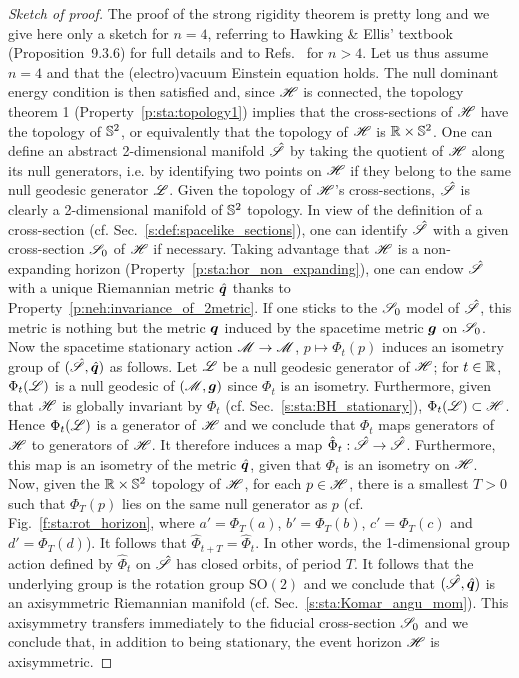 \begin{proof}[Sketch of proof]
The proof of the strong rigidity theorem is pretty long and we
give here only a sketch for $n=4$, referring to Hawking \& Ellis' textbook~\cite{HawkiE73} (Proposition~9.3.6)
for full details and to Refs.~\cite{HollaIW07,HollaI12,MoncrI08}
for $n>4$.
Let us thus assume $n=4$ and that the (electro)vacuum Einstein equation holds.
The null dominant energy condition is then satisfied and, since
$\mathscr{H}$ is connected, the topology theorem 1 (Property~\ref{p:sta:topology1})
implies that the cross-sections of $\mathscr{H}$ have the topology of $\mathbb{S}^2$,
or equivalently that the topology of $\mathscr{H}$ is $\mathbb{R}\times\mathbb{S}^2$. One can define an abstract 2-dimensional manifold $\hat{\mathscr{S}}$
by taking the quotient of $\mathscr{H}$ along its null generators, i.e. by identifying
two points on $\mathscr{H}$ if they belong to the same null geodesic generator $\mathscr{L}$. Given the
topology of $\mathscr{H}$'s cross-sections, $\hat{\mathscr{S}}$ is clearly a 2-dimensional
manifold of $\mathbb{S}^2$ topology. In view of the definition
of a cross-section (cf. Sec.~\ref{s:def:spacelike_sections}),
one can identify $\hat{\mathscr{S}}$
with a given cross-section $\mathscr{S}_0$ of $\mathscr{H}$ if necessary.
Taking advantage that $\mathscr{H}$ is a non-expanding horizon (Property~\ref{p:sta:hor_non_expanding}),
one can endow $\hat{\mathscr{S}}$ with a unique Riemannian metric $\hat{\bm{q}}$
thanks to Property~\ref{p:neh:invariance_of_2metric}. If one sticks to the $\mathscr{S}_0$ model
of $\hat{\mathscr{S}}$, this metric is nothing but the metric $\bm{q}$ induced by
the spacetime metric $\bm{g}$ on $\mathscr{S}_0$. Now the spacetime stationary action
$\mathscr{M} \to \mathscr{M}$, $p \mapsto \Phi_t(p)$
induces an isometry group of $(\hat{\mathscr{S}},\hat{\bm{q}})$ as follows.
Let $\mathscr{L}$ be a null geodesic generator of $\mathscr{H}$; for
$t\in\mathbb{R}$, $\Phi_t(\mathscr{L})$ is a null geodesic of $(\mathscr{M},\bm{g})$ since $\Phi_t$ is
an isometry. Furthermore, given that $\mathscr{H}$ is globally invariant by $\Phi_t$
(cf. Sec.~\ref{s:sta:BH_stationary}), $\Phi_t(\mathscr{L}) \subset \mathscr{H}$. Hence
$\Phi_t(\mathscr{L})$ is a generator of $\mathscr{H}$ and we conclude that
$\Phi_t$ maps generators of $\mathscr{H}$ to generators of $\mathscr{H}$. It therefore
induces a map $\hat{\Phi}_t: \hat{\mathscr{S}} \to \hat{\mathscr{S}}$. Furthermore, this map
is an isometry of the metric $\hat{\bm{q}}$, given that $\Phi_t$ is an isometry
on $\mathscr{H}$. Now, given the $\mathbb{R}\times \mathbb{S}^2$ topology of $\mathscr{H}$, for each $p\in\mathscr{H}$,
there is a smallest $T>0$ such that $\Phi_T(p)$ lies on the same null generator
as $p$ (cf. Fig.~\ref{f:sta:rot_horizon}, where $a' = \Phi_T(a)$,
$b' = \Phi_T(b)$, $c' = \Phi_T(c)$ and $d' = \Phi_T(d)$).
It follows that
$\hat{\Phi}_{t + T} = \hat{\Phi}_t$. In other words, the 1-dimensional group action
defined by $\hat{\Phi}_t$ on $\hat{\mathscr{S}}$ has closed orbits, of period $T$.
It follows that the underlying group is the rotation group $\mathrm{SO}(2)$
and we conclude that $(\hat{\mathscr{S}},\hat{\bm{q}})$ is an axisymmetric Riemannian manifold
(cf. Sec.~\ref{s:sta:Komar_angu_mom}). This axisymmetry transfers immediately
to the fiducial cross-section $\mathscr{S}_0$ and we conclude that, in addition to being
stationary, the event horizon $\mathscr{H}$ is axisymmetric.


\end{proof}
